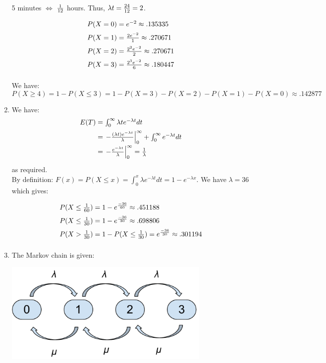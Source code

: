 \documentclass[12pt]{article}
\begin{document}
\begin{enumerate}
5 minutes $\Leftrightarrow$ ${1\over 12}$ hours. Thus, $\lambda t={24\over12}=2$.


$$\begin{array}{@{}r@{\;}c@{\;}l@{}}
P(X=0)&=&e^{-2}\approx .135335\\[2mm]
P(X=1)&=&{2e^{-2}\over1}\approx .270671\\[2mm]
P(X=2)&=&{2^2e^{-2}\over2}\approx .270671\\[2mm]
P(X=3)&=&{2^3e^{-2}\over6}\approx .180447\\[2mm]
\end{array}$$

We have: $$P(X\geq 4)=1-P(X\leq 3)=1-P(X=3)-P(X=2)-P(X=1)-P(X=0)\approx.142877$$

\item We have:
$$\begin{array}{@{}r@{\;}c@{\;}l@{}}
E(T)&=&\int_{0}^{\infty}\lambda te^{-\lambda t}dt\\[2mm]
    &=&\left.-{(\lambda t)e^{-\lambda t}\over \lambda}\right|_{0}^\infty+\int_{0}^{\infty}e^{-\lambda t}dt\\[2mm]
    &=&\left.-{e^{-\lambda t}\over \lambda}\right|_{0}^\infty={1\over \lambda}\\[2mm]
\end{array}$$
  as required.\\
  By definition: $F(x)=P(X\leq x)=\int_{0}^{x}\lambda e^{-\lambda t}dt=1-e^{-\lambda x}$. We have $\lambda=36$ which gives:

$$\begin{array}{@{}r@{\;}c@{\;}l@{}}
P(X\leq{1\over60})&=&1-e^{-36\over 60}\approx .451188\\[2mm]
P(X\leq{1\over30})&=&1-e^{-36\over 30}\approx .698806\\[2mm]
P(X>{1\over30})&=&1-P(X\leq {1\over30})=e^{-36\over 30}\approx .301194\\[2mm]
\end{array}$$

\item

The Markov chain is given:

\begin{center}
\includegraphics[width=10cm]{exercise_5_markov_chain.pdf}
\end{center}


\end{enumerate}
\end{document}

